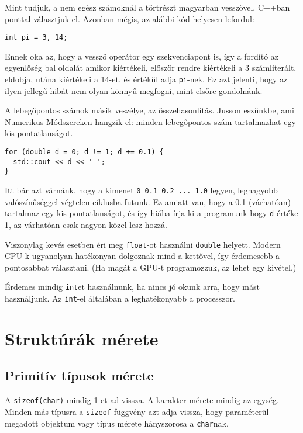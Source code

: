 \documentclass[../cpp_book/cpp_book.tex]{subfiles}
\begin{document}
	\medskip
	Mint tudjuk, a nem egész számoknál a törtrészt magyarban vesszővel, C++ban ponttal választjuk el. Azonban mégis, az alábbi kód helyesen lefordul:
	\begin{lstlisting}
int pi = 3, 14;
	\end{lstlisting}
	Ennek oka az, hogy a vessző operátor egy szekvenciapont is, így a fordító az egyenlőség bal oldalát amikor kiértékeli, először rendre kiértékeli a 3 számliterált, eldobja, utána kiértékeli a 14-et, és értékül adja \texttt{pi}-nek. Ez azt jelenti, hogy az ilyen jellegű hibát nem olyan könnyű megfogni, mint elsőre gondolnánk.
	
	\smallskip
	A lebegőpontos számok másik veszélye, az összehasonlítás. Jusson eszünkbe, ami Numerikus Módszereken hangzik el: minden lebegőpontos szám tartalmazhat egy kis pontatlanságot.
	\begin{lstlisting}
for (double d = 0; d != 1; d += 0.1) {
  std::cout << d << ' ';
}
	\end{lstlisting}
	Itt bár azt várnánk, hogy a kimenet \texttt{0 0.1 0.2 ... 1.0} legyen, legnagyobb valószínűséggel végtelen ciklusba futunk. Ez amiatt van, hogy a 0.1 (várhatóan) tartalmaz egy kis pontatlanságot, és így hiába írja ki  a programunk hogy \texttt{d} értéke 1, az várhatóan csak nagyon közel lesz hozzá.
	\begin{note}
		Viszonylag kevés esetben éri meg \texttt{float}-ot használni \texttt{double} helyett. Modern CPU-k ugyanolyan hatékonyan dolgoznak mind a kettővel, így érdemesebb a pontosabbat választani. (Ha magát a GPU-t programozzuk, az lehet egy kivétel.)
	\end{note}
	\begin{note}
		Érdemes mindig \texttt{int}et használnunk, ha nincs jó okunk arra, hogy mást használjunk. Az \texttt{int}-el általában a leghatékonyabb a processzor.
	\end{note}
	\section{Struktúrák mérete}
	\subsection{Primitív típusok mérete}
	A \texttt{sizeof(char)} mindig 1-et ad vissza. A karakter mérete mindig az egység. Minden más típusra a \texttt{sizeof} függvény azt adja vissza, hogy paraméterül megadott objektum vagy típus mérete hányszorosa a \texttt{char}nak. 
	
\end{document}

